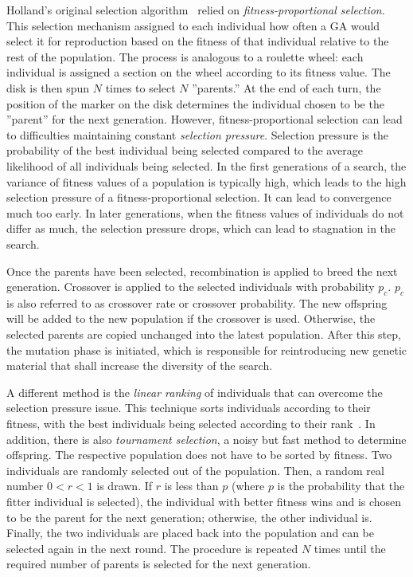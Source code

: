 \documentclass[paper=a4,%
  twoside,%
  BCOR4mm,%
  abstract=true,%
  toc=bibliography,%
  chapterprefix=true,%
  toc=bibliographynumbered,%
  open=right,%
  english,%
  pagesize=pdftex]{scrreprt}
\begin{document}
Holland's original selection algorithm~\cite{Holland1992} relied on \emph{fitness-proportional selection}. This selection mechanism assigned to each individual how often a \ac{GA} would select it for reproduction based on the fitness of that individual relative to the rest of the population. The process is analogous to a roulette wheel: each individual is assigned a section on the wheel according to its fitness value. The disk is then spun $N$ times to select $N$ ''parents.'' At the end of each turn, the position of the marker on the disk determines the individual chosen to be the ''parent'' for the next generation. However, fitness-proportional selection can lead to difficulties maintaining constant \emph{selection pressure}. Selection pressure is the probability of the best individual being selected compared to the average likelihood of all individuals being selected. In the first generations of a search, the variance of fitness values of a population is typically high, which leads to the high selection pressure of a fitness-proportional selection. It can lead to convergence much too early. In later generations, when the fitness values of individuals do not differ as much, the selection pressure drops, which can lead to stagnation in the search.

Once the parents have been selected, recombination is applied to breed the next generation. Crossover is applied to the selected individuals with probability $p_c$. $p_c$ is also referred to as crossover rate or crossover probability. The new offspring will be added to the new population if the crossover is used. Otherwise, the selected parents are copied unchanged into the latest population. After this step, the mutation phase is initiated, which is responsible for reintroducing new genetic material that shall increase the diversity of the search.

A different method is the \emph{linear ranking} of individuals that can overcome the selection pressure issue. This technique sorts individuals according to their fitness, with the best individuals being selected according to their rank~\cite{whitley1989genitor}. In addition, there is also \emph{tournament selection}, a noisy but fast method to determine offspring. The respective population does not have to be sorted by fitness. Two individuals are randomly selected out of the population. Then, a random real number $0 < r < 1$ is drawn. If $r$ is less than $p$ (where $p$ is the probability that the fitter individual is selected), the individual with better fitness wins and is chosen to be the parent for the next generation; otherwise, the other individual is. Finally, the two individuals are placed back into the population and can be selected again in the next round. The procedure is repeated $N$ times until the required number of parents is selected for the next generation.
\end{document}
